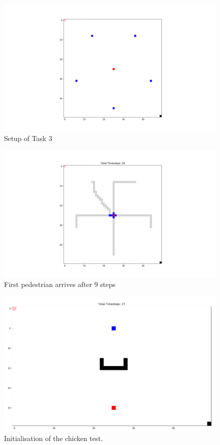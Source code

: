 \documentclass[10pt,a4paper]{article}
\begin{document}
\begin{figure}[h!]
    \centering
    \includegraphics[width=\textwidth]{pictures/Task3_start.png}
    \caption{Setup of Task 3}
    \label{fig:start_3}
\end{figure}
\begin{figure}[h!]
    \centering
    \includegraphics[width=\textwidth]{pictures/Task3_end.png}
    \caption{First pedestrian arrives after 9 steps}
    \label{fig:3_end}
\end{figure}
\begin{figure}[h!]
    \centering
    \includegraphics[width=\textwidth]{pictures/start_task4_obst.PNG}
    \caption{Initialisation of the chicken test.}
    \label{fig:obst_start}
\end{figure}
\end{document}
